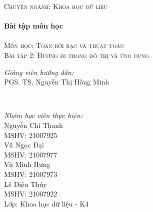 \documentclass[14pt, a4paper]{article}
\theoremstyle{sltheorem}
\theoremstyle{soltheorem}
\begin{document}
\begin{titlepage}
        \textsc{\Large Chuyên ngành: Khoa học dữ liệu}\\[0.5cm] %



        \HRule \\[0.4cm]
        { \huge \bfseries Bài tập môn học}\\[0.4cm] %
        \HRule \\[1.5cm]

        \textsc{\Large Môn học: Toán rời rạc và thuật toán}\\[1cm] %


        \textsc{\Large Bài tập 2: Đường đi trong đồ thị và ứng dụng}\\[1cm]


        \begin{minipage}{0.4\textwidth}
            \begin{flushleft} \large
            \emph{Giảng viên hướng dẫn:} \\
            PGS. TS. Nguyễn Thị Hồng Minh %
            \end{flushleft}
        \end{minipage}\\[0.5cm]

        \begin{minipage}{0.4\textwidth}
        \begin{flushleft} \large
        \emph{Nhóm học viên thực hiện:}\\
        Nguyễn Chí Thanh \\
        MSHV: 21007925 \\ %
        Vũ Ngọc Đại \\
        MSHV: 21007977 \\
        Vũ Minh Hưng \\
        MSHV: 21007973 \\
        Lê Diệu Thúy \\
        MSHV: 21007922 \\
        Lớp: Khoa học dữ liệu - K4
        \end{flushleft}
        \end{minipage}



\end{titlepage}
\end{document}
